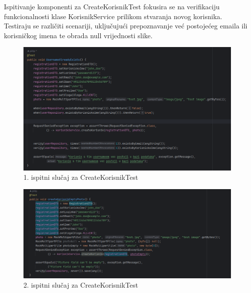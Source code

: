 Ispitivanje komponenti za CreateKorisnikTest fokusira se na verifikaciju funkcionalnosti klase KorisnikService prilikom stvaranja novog korisnika. Testiraju se različiti scenariji, uključujući prepoznavanje već postojećeg emaila ili korisničkog imena te obrada null vrijednosti slike.

\begin{figure}[H]
	\includegraphics[width=\textwidth]{slike/username.png} %
	\centering
	\caption{1. ispitni slučaj za CreateKorisnikTest}
	\label{fig:dijagramstanja}
\end{figure}

\begin{figure}[H]
	\includegraphics[width=\textwidth]{slike/korisnikslika.png} %
	\centering
	\caption{2. ispitni slučaj za CreateKorisnikTest}
	\label{fig:dijagramstanja}
\end{figure}

